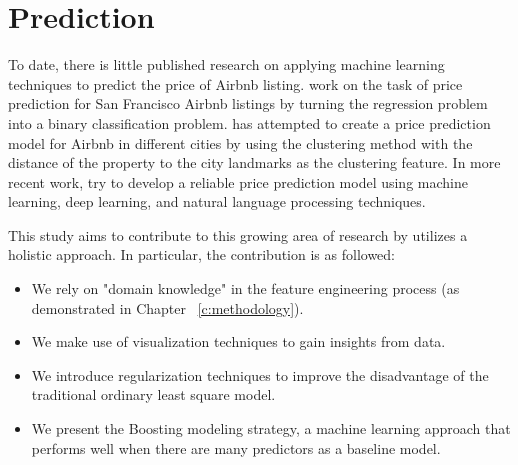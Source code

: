 \section{Prediction}

To date, there is little published research on applying machine learning
techniques to predict the price of Airbnb listing.
\cite{tang2015neighborhood} work on the task of price prediction for San
Francisco Airbnb listings by turning the regression problem into a binary
classification problem.
\cite{li2016reasonable} has attempted to create a price prediction model for
Airbnb in different cities by using the clustering method with the distance of
the property to the city landmarks as the clustering feature.
In more recent work, \cite{kalehbasti2019airbnb}  try to develop a reliable
price prediction model using machine learning, deep learning, and natural
language processing techniques.


This study aims to contribute to this growing area of research by utilizes a
holistic approach. In particular, the contribution is as followed:
\begin{itemize}
  \item We rely on "domain knowledge" in the feature engineering process (as
    demonstrated in Chapter ~\ref{c:methodology}).
  \item We make use of visualization techniques to gain insights from data.
  \item We introduce regularization techniques to improve the disadvantage of the
  traditional ordinary least square model.
  \item We present the Boosting modeling strategy, a machine learning approach
    that performs well when there are many predictors as a baseline model.
\end{itemize}
